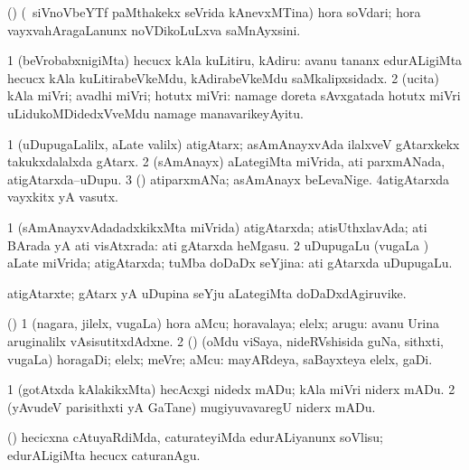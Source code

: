 \bentry
{}
\gl{\nA}
\bmng
(\kerxY) (\kanmu\ siVnoVbeYTf paMthakekx seVrida kAnevxMTina) hora soVdari; hora vayxvahAragaLanunx noVDikoLuLxva saMnAyxsini. 
\emng
\eentry

\bentry
{}
\gl{\sakirx}
\bmng
\bnum
\num{1} (beVrobabxnigiMta) hecucx kAla kuLitiru, kAdiru:  avanu tananx edurALigiMta hecucx kAla kuLitirabeVkeMdu, kAdirabeVkeMdu saMkalipxsidadx. 
\num{2} (ucita) kAla miVri; avadhi miVri; hotutx miVri:  namage doreta sAvxgatada hotutx miVri uLidukoMDidedxVveMdu namage manavarikeyAyitu. 
\enum
\emng
\eentry

\bentry
{}
\gl{\nA}
\bmng
\bnum
\num{1} (uDupugaLalilx, aLate \mo valilx) atigAtarx; asAmAnayxvAda ilalxveV gAtarxkekx takukxdalalxda gAtarx. 
\num{2} (sAmAnayx) aLategiMta miVrida, ati parxmANada, atigAtarxda--uDupu. 
\num{3} (\rUpa) atiparxmANa; asAmAnayx beLevaNige. 
\num{4}atigAtarxda vayxkitx yA vasutx. 
\enum
\emng
\eentry

\bentry
{}
\gl{\gu}
\bmng
\bnum
\num{1} (sAmAnayxvAdadadxkikxMta miVrida) atigAtarxda; atisUthxlavAda; ati BArada yA ati visAtxrada:  ati gAtarxda heMgasu. 
\num{2} uDupugaLu (\mo vugaLa \vi) aLate miVrida; atigAtarxda; tuMba doDaDx seYjina:  ati gAtarxda uDupugaLu. 
\enum
\emng
\eentry

\bentry
{}
\gl{\nA}
\bmng
atigAtarxte; gAtarx yA uDupina seYju aLategiMta doDaDxdAgiruvike. 
\emng
\eentry

\bentry
{}
\gl{\nA}
\bmng
(\bava) 
\bnum
\num{1} (nagara, jilelx, \mo vugaLa) hora aMcu; horavalaya; elelx; arugu:  avanu Urina aruginalilx vAsisutitxdAdxne. 
\num{2} (\rUpa) (oMdu viSaya, nideRVshisida guNa, sithxti, \mo vugaLa) horagaDi; elelx; meVre; aMcu:  mayARdeya, saBayxteya elelx, gaDi. 
\enum
\emng
\eentry

\bentry
{}
\gl{\sakirx}
\bmng
\bnum
\num{1} (gotAtxda kAlakikxMta) hecAcxgi nidedx mADu; kAla miVri niderx mADu. 
\num{2} (yAvudeV parisithxti yA GaTane) mugiyuvavaregU niderx mADu. 
\enum
\emng
\eentry

\bentry
{}
\gl{\sakirx}
\bmng
(\AmA) hecicxna cAtuyaRdiMda, caturateyiMda edurALiyanunx soVlisu; edurALigiMta hecucx caturanAgu. 
\emng

